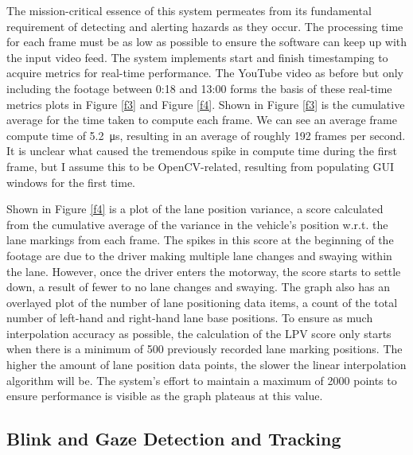 \documentclass[10pt,conference]{IEEEtran}
\begin{document}
The mission-critical essence of this system permeates from its fundamental requirement of detecting and alerting hazards as they occur. The processing time for each frame must be as low as possible to ensure the software can keep up with the input video feed. The system implements start and finish timestamping to acquire metrics for real-time performance. The YouTube video as before \cite{b8} but only including the footage between 0:18 and 13:00 forms the basis of these real-time metrics plots in Figure \ref{f3} and Figure \ref{f4}. Shown in Figure \ref{f3} is the cumulative average for the time taken to compute each frame. We can see an average frame compute time of \SI{5.2}{\micro\second}, resulting in an average of roughly 192 frames per second. It is unclear what caused the tremendous spike in compute time during the first frame, but I assume this to be OpenCV-related, resulting from populating GUI windows for the first time.

Shown in Figure \ref{f4} is a plot of the lane position variance, a score calculated from the cumulative average of the variance in the vehicle's position w.r.t. the lane markings from each frame. The spikes in this score at the beginning of the footage are due to the driver making multiple lane changes and swaying within the lane. However, once the driver enters the motorway, the score starts to settle down, a result of fewer to no lane changes and swaying. The graph also has an overlayed plot of the number of lane positioning data items, a count of the total number of left-hand and right-hand lane base positions. To ensure as much interpolation accuracy as possible, the calculation of the LPV score only starts when there is a minimum of 500 previously recorded lane marking positions. The higher the amount of lane position data points, the slower the linear interpolation algorithm will be. The system's effort to maintain a maximum of 2000 points to ensure performance is visible as the graph plateaus at this value.

\subsection{Blink and Gaze Detection and Tracking}
\end{document}
